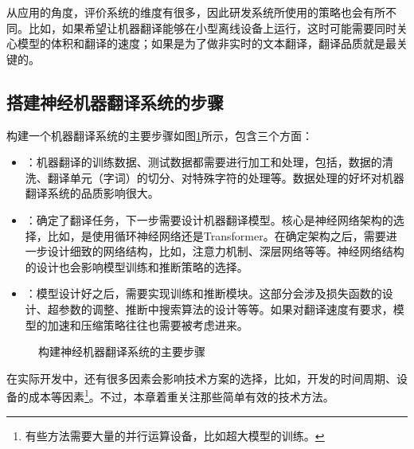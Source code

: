 \parinterval 从应用的角度，评价系统的维度有很多，因此研发系统所使用的策略也会有所不同。比如，如果希望让机器翻译能够在小型离线设备上运行，这时可能需要同时关心模型的体积和翻译的速度；如果是为了做非实时的文本翻译，翻译品质就是最关键的。


\subsection{搭建神经机器翻译系统的步骤 }

\parinterval 构建一个机器翻译系统的主要步骤如图\ref{fig:7-2}所示，包含三个方面：

\begin{itemize}
\vspace{0.5em}
\item {\small{}}：机器翻译的训练数据、测试数据都需要进行加工和处理，包括，数据的清洗、翻译单元（字词）的切分、对特殊字符的处理等。数据处理的好坏对机器翻译系统的品质影响很大。
\vspace{0.5em}
\item {\small{}}：确定了翻译任务，下一步需要设计机器翻译模型。核心是神经网络架构的选择，比如，是使用循环神经网络还是Transformer。在确定架构之后，需要进一步设计细致的网络结构，比如，注意力机制、深层网络等等。神经网络结构的设计也会影响模型训练和推断策略的选择。
\vspace{0.5em}
\item {\small{}}：模型设计好之后，需要实现训练和推断模块。这部分会涉及损失函数的设计、超参数的调整、推断中搜索算法的设计等等。如果对翻译速度有要求，模型的加速和压缩策略往往也需要被考虑进来。
\end{itemize}

\begin{figure}[htp]
\centering

\caption{构建神经机器翻译系统的主要步骤}
\label{fig:7-2}
\end{figure}

\parinterval 在实际开发中，还有很多因素会影响技术方案的选择，比如，开发的时间周期、设备的成本等因素\footnote{有些方法需要大量的并行运算设备，比如超大模型的训练。}。不过，本章着重关注那些简单有效的技术方法。

